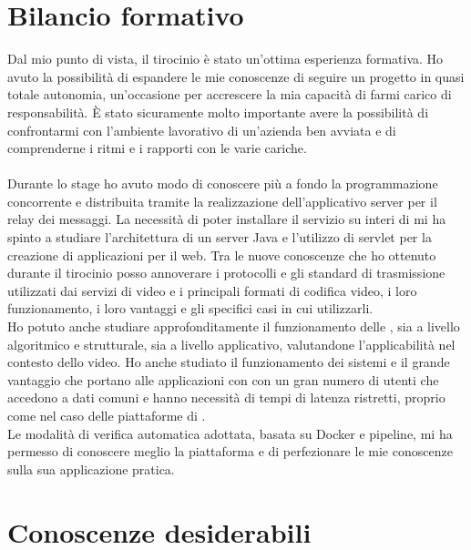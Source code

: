 \section{Bilancio formativo}
Dal mio punto di vista, il tirocinio è stato un'ottima esperienza formativa. Ho avuto la possibilità di espandere le mie conoscenze di seguire un progetto in quasi totale autonomia, un'occasione per accrescere la mia capacità di farmi carico di responsabilità. È stato sicuramente molto importante avere la possibilità di confrontarmi con l'ambiente lavorativo di un'azienda ben avviata e di comprenderne i ritmi e i rapporti con le varie cariche.
\paragraph*{}
Durante lo stage ho avuto modo di conoscere più a fondo la programmazione concorrente e distribuita tramite la realizzazione dell'applicativo server per il relay dei messaggi. La necessità di poter installare il servizio su interi  di  mi ha spinto a studiare l'architettura di un server Java e l'utilizzo di servlet per la creazione di applicazioni per il web. Tra le nuove conoscenze che ho ottenuto durante il tirocinio posso annoverare i protocolli e gli standard di trasmissione utilizzati dai servizi di  video e i principali formati di codifica video, i loro funzionamento, i loro vantaggi e gli specifici casi in cui utilizzarli.
\\
Ho potuto anche studiare approfonditamente il funzionamento delle , sia a livello algoritmico e strutturale, sia a livello applicativo, valutandone l'applicabilità nel contesto dello  video. Ho anche studiato il funzionamento dei sistemi  e il grande vantaggio che portano alle applicazioni con con un gran numero di utenti che accedono a dati comuni e hanno necessità di tempi di latenza ristretti, proprio come nel caso delle piattaforme di . 
\\
Le modalità di verifica automatica adottata, basata su Docker e pipeline, mi ha permesso di conoscere meglio la piattaforma e di perfezionare le mie conoscenze sulla sua applicazione pratica.

\section{Conoscenze desiderabili}

